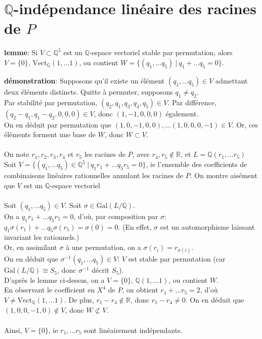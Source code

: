 \documentclass[a4paper, 12pt]{article}
\begin{document}
	
	\section{$\mathbb Q$-indépendance linéaire des racines de $P$}
	\textbf{lemme}: Si $V \subset \mathbb Q^5$ est un $\mathbb Q$-espace vectoriel stable par permutation, alors $V = \{0\}$, $\mathrm{Vect}_\mathbb Q (1, \dots 1)$, ou contient $W = \{(q_1, \dots q_5) \ |\ q_1 + \dots q_5 = 0\}$.
	
	\textbf{démonstration}: Supposons qu'il existe un élément  $(q_1, \dots q_5) \in V$ admettant deux éléments distincts. Quitte à permuter, supposons $q_1 \not = q_2$. \\
	Par stabilité par permutation, $(q_2, q_1, q_3, q_4, q_5) \in V$. Par différence, $(q_2 - q_1, q_1 - q_2, 0, 0, 0) \in V$, donc $(1, -1, 0, 0, 0)$ également.\\ On en déduit par permutation que $(1, 0, -1, 0, 0), \dots (1, 0, 0, 0, -1) \in V$. Or, ces éléments forment une base de $W$, donc $W \subset V$.
	\\ \\
	
	On note $r_1, r_2, r_3, r_4 \text{ et } r_5$ les racines de $P$, avec $r_4, r_5 \not \in \mathbb R$, et $L = \mathbb Q (r_1, \dots r_5)$ \\
	Soit $V = \{(q_1, \dots q_5) \in \mathbb Q^5\ |\ q_1 r_1 + \dots q_5 r_5 = 0\}$, ie l'ensemble des coefficients de combinaisons linéaires rationnelles annulant les racines de $P$. On montre aisément que $V$ est un $\mathbb Q$-espace vectoriel
	\\ \\
	
	Soit $(q_1, \dots q_5) \in V$. Soit $\sigma \in \mathrm{Gal} (L/\mathbb Q)$. \\
	On a $q_1 r_1 + \dots q_5 r_5 = 0$, d'où, par composition par $\sigma$: $q_1 \sigma (r_1) + \dots q_5 \sigma(r_5) = \sigma(0) = 0$. (En effet, $\sigma$ est un automorphisme laissant invariant les rationnels.) \\
	Or, en assimilant $\sigma$ à une permutation, on a $\sigma(r_i) = r_{\sigma(i)}$.\\ On en déduit que $\sigma^{-1}(q_1, \dots q_5) \in V$: $V$ est stable par permutation (car $\mathrm{Gal} (L/\mathbb Q) \cong S_5$, donc $\sigma^{-1}$ décrit $S_5$). \\
	
	D'après le lemme ci-dessus, on a $V = \{0\}$, $\mathbb Q (1, \dots 1)$, ou contient $W$.\\
	En observant le coefficient en $X^4$ de $P$, on obtient $r_1 + \dots r_5 = 2$, d'où $V \not = \mathrm{Vect}_\mathbb Q (1, \dots 1)$. De plus, $r_1-r_4 \not \in \mathbb R$, donc $r_1 - r_4 \not = 0$. On en déduit que $(1, 0, 0, -1, 0) \not \in V$, donc $W \not \subset V$.
	\\ \\
	Ainsi, $V = \{0\}$, ie $r_1, \dots r_5$ sont linéairement indépendants.
	
\end{document}

